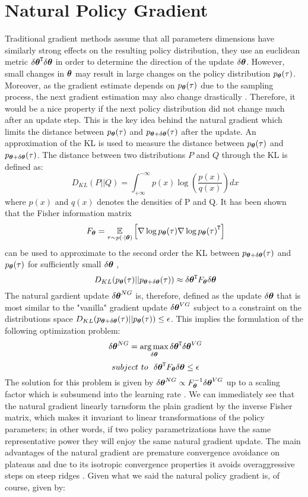 \vspace{-0.05in}
\section{Natural Policy Gradient}\label{sec:npg}
Traditional gradient methods assume that all parameters dimensions have similarly strong effects on the resulting policy distribution, \ie they use an euclidean metric $\transpose{\delta\vtheta}\delta\vtheta$ in order to determine the direction of the update $\delta\vtheta$. However, small changes in $\vtheta$ may result in large changes on the policy distribution $p_{\vtheta}(\tau)$. Moreover, as the gradient estimate depends on $p_{\vtheta}(\tau)$ due to the sampling process, the next gradient estimation may also change drastically \citep{deisenroth2013survey}. Therefore, it would be a nice property if the next policy distribution did not change much after an update step. This is the key idea behind the natural gradient which limits the distance between $p_{\vtheta}(\tau)$ and $p_{\vtheta+\delta\vtheta}(\tau)$ after the update. An approximation of the \ac{KL} is used to measure the distance between $p_{\vtheta}(\tau)$ and $p_{\vtheta+\delta\vtheta}(\tau)$. The distance between two distributions $P$ and $Q$ through the \acs{KL} is defined as:
\[
\	D_{KL}(P||Q)=\int_{+\infty}^{-\infty}p(x)\log\left(\frac{p(x)}{q(x)}\right)dx
\]
where $p(x)$ and $q(x)$ denotes the densities of P and Q. It has been shown that the Fisher information matrix
\[
\ F_{\vtheta}=\EVV[\tau \sim p(\cdot|\vtheta)]{\score{\vtheta}{\tau}\transpose{\score{\vtheta}{\tau}}}
\]
can be used to approximate to the second order the \acs{KL} between $p_{\vtheta+\delta\vtheta}(\tau)$ and $p_{\vtheta}(\tau)$ for sufficiently small $\delta\vtheta$ \citep{jeffreys1998theory}, \ie
\[
\ D_{KL}(p_{\vtheta}(\tau)||p_{\vtheta+\delta\vtheta}(\tau))\approx\transpose{\delta\vtheta}F_{\vtheta}\delta\vtheta
\]
The natural gardient update $\delta\vtheta^{NG}$ is, therefore, defined as the update $\delta\vtheta$ that is most similar to the "vanilla" gradient update $\delta\vtheta^{VG}$  subject to a constraint  on the distributions space $D_{KL}(p_{\vtheta+\delta\vtheta}(\tau)||p_{\vtheta}(\tau))\le\epsilon$.
This implies the formulation of the following optimization problem:
\[
\ \delta\vtheta^{NG}=\argmax_{\delta\vtheta}\transpose{\delta\vtheta}\delta\vtheta^{VG}
\] 
\[
\ subject~to  ~~\transpose{\delta\vtheta}F_{\vtheta}\delta\vtheta\le\epsilon
\]
The solution for this problem is given by $\delta\vtheta^{NG}\propto F^{-1}_{\vtheta}\delta\vtheta^{VG}$ up to a scaling factor which is subsumend into the learning rate \citep{deisenroth2013survey}. We can immediately see that the natural gradient linearly tarnsform the plain gradient by the inverse Fisher matrix, which makes it invariant to linear transformations of the policy parameters; in other words, if two policy parametrizations have the same representative power they will enjoy the same natural gradient update. The main advantages of the natural gradient are premature convergence avoidance on plateaus and due to its isotropic convergence properties it avoids overaggressive steps on steep ridges \citep{deisenroth2013survey}. Given what we said the natural policy gradient is, of course, given by:
